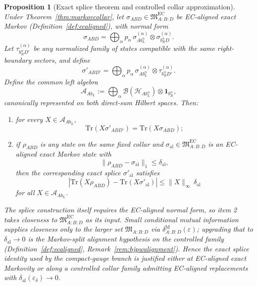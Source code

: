 \documentclass[11pt]{article}
\newtheorem{proposition}[theorem]{Proposition}
\begin{document}
\begin{proposition}[Exact splice theorem and controlled collar approximation]\label{prop:splice}
Under Theorem~\ref{thm:markovcollar}, let \(\sigma_{ABD}\in \mathfrak M^{\mathrm{EC}}_{A:B:D}\) be EC-aligned exact Markov (Definition~\ref{def:ecaligned}), with normal form
\[
\sigma_{ABD}
=
\bigoplus_\alpha p_\alpha\,
\sigma^{(\alpha)}_{A b_L^\alpha}\otimes \sigma^{(\alpha)}_{b_R^\alpha D}.
\]
Let \(\tau^{(\alpha)}_{b_R^\alpha D'}\) be any normalized family of states compatible with the same right-boundary sectors, and define
\[
\sigma'_{AB D'}
=
\bigoplus_\alpha p_\alpha\,
\sigma^{(\alpha)}_{A b_L^\alpha}\otimes \tau^{(\alpha)}_{b_R^\alpha D'}.
\]
Define the common left algebra
\[
\mathcal A_{A b_L}:=
\bigoplus_\alpha \mathcal B(\mathcal H_{A b_L^\alpha})\otimes \mathbf 1_{b_R^\alpha},
\]
canonically represented on both direct-sum Hilbert spaces. Then:
\begin{enumerate}[leftmargin=2em]
\item for every \(X\in\mathcal A_{A b_L}\),
\[
\mathrm{Tr}(X\sigma'_{AB D'})=\mathrm{Tr}(X\sigma_{ABD});
\]
\item if \(\rho_{ABD}\) is any state on the same fixed collar and \(\sigma_{\mathrm{al}}\in\mathfrak M^{\mathrm{EC}}_{A:B:D}\) is an EC-aligned exact Markov state with
\[
\|\rho_{ABD}-\sigma_{\mathrm{al}}\|_1
\le
\delta_{\mathrm{al}},
\]
then the corresponding exact splice \(\sigma'_{\mathrm{al}}\) satisfies
\[
\left|
\mathrm{Tr}(X\rho_{ABD})-\mathrm{Tr}(X\sigma'_{\mathrm{al}})
\right|
\le
\|X\|_\infty\,\delta_{\mathrm{al}}
\]
for all \(X\in\mathcal A_{A b_L}\).
\end{enumerate}
The splice construction itself requires the EC-aligned normal form, so item 2 takes closeness to \(\mathfrak M^{\mathrm{EC}}_{A:B:D}\) as its input. Small conditional mutual information supplies closeness only to the larger set \(\mathfrak M_{A:B:D}\) via \(\delta^{\mathrm M}_{A:B:D}(\varepsilon)\); upgrading that to \(\delta_{\mathrm{al}}\to0\) is the Markov-split alignment hypothesis on the controlled family (Definition~\ref{def:ecaligned}, Remark~\ref{rem:hjpwalignment}). Hence the exact splice identity used by the compact-gauge branch is justified either at EC-aligned exact Markovity or along a controlled collar family admitting EC-aligned replacements with \(\delta_{\mathrm{al}}(\varepsilon_\delta)\to 0\).
\end{proposition}
\end{document}
